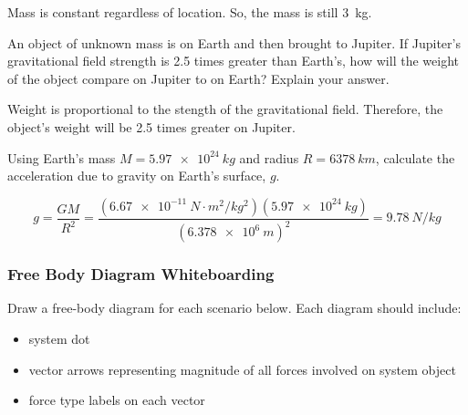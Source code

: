 \documentclass[../main-physics-problems.tex]{subfiles}
\begin{document}
\begin{questions}
\begin{solution}
Mass is constant regardless of location. So, the mass is still \SI{3}{kg}.
\end{solution}

\question
An object of unknown mass is on Earth and then brought to Jupiter. If Jupiter's gravitational field strength is 2.5 times greater than Earth's, how will the weight of the object compare on Jupiter to on Earth? Explain your answer.

\begin{solution}
    Weight is proportional to the stength of the gravitational field. Therefore, the object's weight will be 2.5 times greater on Jupiter.
\end{solution}


\question
Using Earth's mass $M = \SI{5.97e24}{kg}$ and radius $R = \SI{6378}{km}$, calculate the acceleration due to gravity on Earth's surface, $g$.

\begin{solution}
\begin{equation*}
    g = \frac{GM}{R^2} = \frac{(\SI{6.67e-11}{N\cdot m^2/kg^2})(\SI{5.97e24}{kg})}{\left(\SI{6.378e6}{m}\right)^2} = \boxed{\SI{9.78}{N/kg}}
\end{equation*}
\end{solution}
\end{questions}

\clearpage




\clearpage
\subsubsection*{Free Body Diagram Whiteboarding}

Draw a free-body diagram for each scenario below. Each diagram should include:

\begin{itemize}[itemsep=0pt,topsep=0pt]
    \item system dot
    \item vector arrows representing magnitude of all forces involved on system object
    \item force type labels on each vector
\end{itemize}
\end{document}
